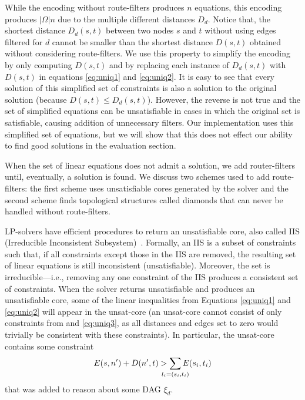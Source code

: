 While the encoding without route-filters produces $n$ equations, this encoding produces $|\Omega|n$ due
to the multiple different distances $D_d$.
Notice that, the shortest distance $D_d(s,t)$ between two nodes $s$ and $t$ without using edges filtered for $d$ cannot be
smaller than the shortest distance $D(s,t)$ obtained without considering route-filters.
We use this property to simplify the encoding by only computing $D(s,t)$ and by replacing each instance of $D_d(s,t)$
with $D(s,t)$ in
equations \eqref{eq:uniq1} and \eqref{eq:uniq2}. 
It is easy to see that every solution of this simplified set of constraints
is also a solution to the original solution (because $D(s,t)\leq D_d(s,t)$).
However, the reverse is not true and the set of simplified equations can be unsatisfiable
in cases in which the original set is satisfiable, causing addition of unnecessary filters.
Our implementation uses this simplified set of equations, but we will show that this
does not effect our ability to find good solutions in the evaluation section.


When the set of linear equations does not admit a solution, we 
add router-filters until, eventually, a solution is found.
We discuss two schemes used to add route-filters:
the first scheme uses unsatisfiable cores generated
by the solver and the second scheme 
finds topological structures called diamonds that 
can never be handled without route-filters.

LP-solvers have efficient procedures to return an
unsatisfiable core, also called IIS (Irreducible Inconsistent Subsystem)~\cite{chinneck2007feasibility}. 
Formally, an IIS is a subset of constraints such that,
if all constraints except those in the IIS are removed, the resulting set of
linear equations is still inconsistent (unsatisfiable). Moreover, the set is irreducible---i.e., removing 
any one constraint of the IIS produces a consistent set of constraints. 
When the solver returns unsatisfiable and produces
an unsatisfiable core,
some of the linear inequalities from 
Equations \eqref{eq:uniq1} and  \eqref{eq:uniq2}
will appear in the unsat-core 
(an unsat-core cannot consist of only 
constraints from  and \eqref{eq:uniq3}, as all distances and edges set to zero
would trivially be consistent with these constraints). 
In particular, the unsat-core contains some constraint
\begin{eqnarray}
E(s, n') + D(n', t) > \sum_{\mathclap{\substack{l_i=(s_i,t_i)}}} 
		E(s_i, t_i) 
\end{eqnarray}
that was added to reason about some DAG $\xi_d$.

